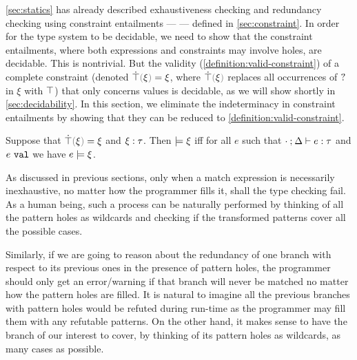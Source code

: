 \autoref{sec:statics} has already described exhaustiveness checking and redundancy checking using constraint entailments ---  --- defined in \autoref{sec:constraint}. In order for the type system to be decidable, we need to show that the constraint entailments, where both expressions and constraints may involve holes, are decidable. This is nontrivial. But the validity (\autoref{definition:valid-constraint}) of a complete constraint (denoted $\ctruify{\xi}=\xi$, where $\ctruify{\xi}$ replaces all occurrences of $\mathtt{?}$ in $\xi$ with $\top$) that only concerns values is decidable, as we will show shortly in \autoref{sec:decidability}.
%
In this section, we eliminate the indeterminacy in constraint entailments by showing that they can be reduced to \autoref{definition:valid-constraint}. 

\begin{definition}
  \label{definition:valid-constraint}
  Suppose that $\ctruify{\xi}=\xi$ and $\xi : \tau$.
  Then $\models \xi$ iff for all $e$ such that $\cdot \mathbin{;} \Delta \vdash e : \tau$ and $e ~\mathtt{val}$ we have $e \models \xi$.
\end{definition}


As discussed in previous sections, only when a match expression is necessarily inexhaustive, no matter how the programmer fills it, shall the type checking fail. As a human being, such a process can be naturally performed by thinking of all the pattern holes as wildcards and checking if the transformed patterns cover all the possible cases. 

Similarly, if we are going to reason about the redundancy of one branch with respect to its previous ones in the presence of pattern holes, the programmer should only get an error/warning if that branch will never be matched no matter how the pattern holes are filled. It is natural to imagine all the previous branches with pattern holes would be refuted during run-time as the programmer may fill them with any refutable patterns. On the other hand, it makes sense to have the branch of our interest to cover, by thinking of its pattern holes as wildcards, as many cases as possible.%


